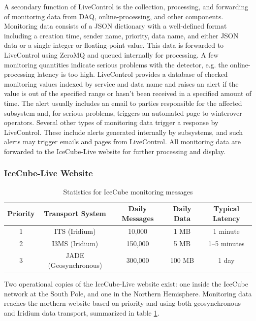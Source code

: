 A secondary function of LiveControl is the collection, processing, and forwarding of monitoring data from DAQ, online-processing, and other components.
Monitoring data consists of a JSON dictionary with a well-defined format including a creation time, sender name, priority, data name, and either JSON data
or a single integer or floating-point value.  This data is forwarded to LiveControl using ZeroMQ and queued internally for processing.  A few monitoring
quantities indicate serious problems with the detector, e.g. the online-processing latency is too high.  LiveControl provides a database of checked monitoring
values indexed by service and data name and raises an alert if the value is out of the specified range or hasn't been received in a specified amount of time.
The alert usually includes an email to parties responsible for the affected subsystem and, for serious problems, triggers an automated page to winterover operators.
Several other types of monitoring data trigger a response by LiveControl.  These include alerts generated internally by subsystems, and such alerts may trigger emails
and pages from LiveControl.  All monitoring data are forwarded to the IceCube-Live website for further processing and display.

\subsubsection{IceCube-Live Website}

\begin{table}[!ht]
\begin{tabular}{|c|c|c|c|c|}
\hline
Priority & Transport System & Daily Messages & Daily Data & Typical Latency\\
\hline
1 & ITS (Iridium) & 10,000 & 1 MB & 1 minute \\
\hline
2 & I3MS (Iridium) & 150,000 & 5 MB & 1--5 minutes \\
\hline
3 & JADE (Geosynchronous) & 300,000 & 100 MB & 1 day \\
\hline
\end{tabular}
\caption{Statistics for IceCube monitoring messages}
\label{i3messages}
\end{table}

Two operational copies of the IceCube-Live website exist: one inside the IceCube network at the South Pole, and
one in the Northern Hemisphere.  Monitoring data reaches the northern website based on priority and using
both geosynchronous and Iridium data transport, summarized in table \ref{i3messages}.

